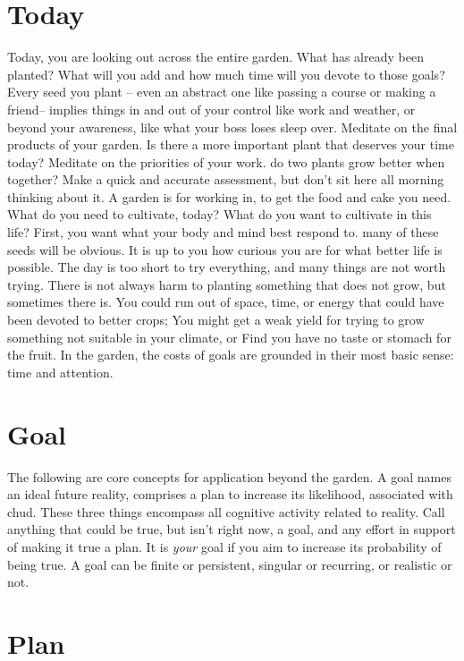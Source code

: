 \documentclass[
]{book}
\begin{document}
\section{Today}\label{today}

Today, you are looking out across the entire garden.
What has already been planted? What will you add and how much time will you devote to those goals?
Every seed you plant -- even an abstract one like passing a course or making a friend-- implies things in and out of your control like work and weather, or beyond your awareness, like what your boss loses sleep over.
Meditate on the final products of your garden.
Is there a more important plant that deserves your time today?
Meditate on the priorities of your work. do two plants grow better when together?
Make a quick and accurate assessment, but don't sit here all morning thinking about it.
A garden is for working in, to get the food and cake you need.
What do you need to cultivate, today?
What do you want to cultivate in this life?
First, you want what your body and mind best respond to. many of these seeds will be obvious.
It is up to you how curious you are for what better life is possible.
The day is too short to try everything, and many things are not worth trying.
There is not always harm to planting something that does not grow, but sometimes there is.
You could run out of space, time, or energy that could have been devoted to better crops;
You might get a weak yield for trying to grow something not suitable in your climate, or
Find you have no taste or stomach for the fruit.
In the garden, the costs of goals are grounded in their most basic sense: time and attention.

\section{Goal}\label{goal}

The following are core concepts for application beyond the garden.
A goal names an ideal future reality, comprises a plan to increase its likelihood, associated with chud.
These three things encompass all cognitive activity related to reality.
Call anything that could be true, but isn't right now, a goal, and any effort in support of making it true a plan.
It is \emph{your} goal if you aim to increase its probability of being true.
A goal can be finite or persistent, singular or recurring, or realistic or not.

\section{Plan}\label{plan}
\end{document}
